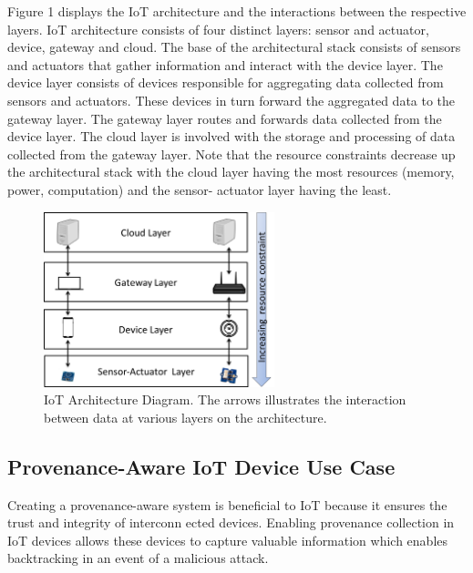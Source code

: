\documentclass[conference]{IEEEtran}
\begin{document}
\par Figure 1 displays the IoT architecture and the interactions between the respective
layers. IoT architecture consists of four distinct layers: sensor and actuator, device, gateway and cloud. The base of the architectural stack consists of sensors and actuators that gather information and interact with the device layer. The device layer consists of
devices responsible for aggregating
data collected from sensors and actuators. These devices in turn forward the aggregated
data to the gateway layer. The gateway layer routes and forwards data collected from the
device layer.
The cloud layer is involved with the storage and processing of data collected from the
gateway layer. Note that the resource constraints decrease up the architectural stack with
the cloud layer having the most resources (memory, power, computation) and the sensor-
actuator layer having the least. 




\begin{figure}[h!]
\begin{center}

\includegraphics[height=2.0in]{iot_architecture.png}
\end{center}
\caption{IoT Architecture Diagram. The arrows illustrates the interaction between data at various layers on the architecture.}
\label{iot_architecture}

\end{figure}

\subsection{Provenance-Aware IoT Device Use Case}

Creating a provenance-aware system is beneficial to IoT because it
ensures the trust and integrity of interconn ected devices. Enabling provenance collection in IoT devices allows these devices to capture valuable information which enables backtracking in an event of a malicious attack. 
\end{document}
